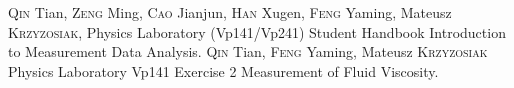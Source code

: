 \begin{thebibliography}{99}
     \textsc{Qin} Tian, \textsc{Zeng} Ming, \textsc{Cao} Jianjun, \textsc{Han} Xugen, \textsc{Feng} Yaming, Mateusz \textsc{Krzyzosiak}, Physics Laboratory (Vp141/Vp241) Student Handbook Introduction to Measurement Data Analysis.
     \textsc{Qin} Tian, \textsc{Feng} Yaming, Mateusz \textsc{Krzyzosiak} Physics Laboratory Vp141 Exercise 2 Measurement of Fluid Viscosity.
\end{thebibliography}
